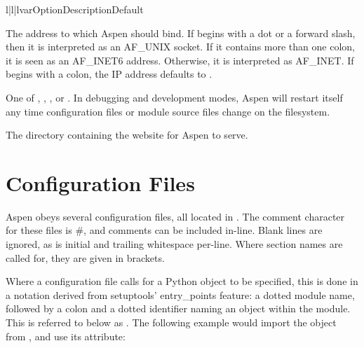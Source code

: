 \begin{tableiii}{l|l|l}{var}{Option}{Description}{Default}

    {The address to which Aspen should bind. If  begins with a dot
    or a forward slash, then it is interpreted as an AF_UNIX socket. If it
    contains more than one colon, it is seen as an AF_INET6 address. Otherwise,
    it is interpreted as AF_INET. If  begins with a colon, the IP
    address defaults to .} {}


    {One of , , , or
    . In debugging and development modes, Aspen will restart
    itself any time configuration files or module source files change on the
    filesystem.}
    {}

    {The directory containing the website for Aspen to serve.}
    {}


\end{tableiii}


\section{Configuration Files \label{config-files}}

Aspen obeys several configuration files, all located in . The
comment character for these files is \#, and comments can be included in-line.
Blank lines are ignored, as is initial and trailing whitespace per-line. Where
section names are called for, they are given in brackets.

Where a configuration file calls for a Python object to be specified, this is
done in a notation derived from setuptools' entry_points feature: a dotted
module name, followed by a colon and a dotted identifier naming an object within
the module. This is referred to below as . The following
example would import the  object from , and
use its  attribute:

